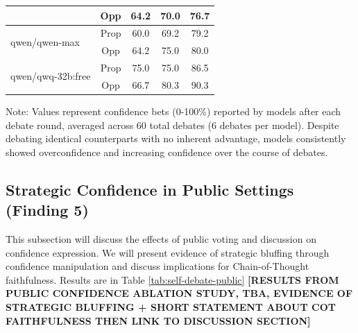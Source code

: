\documentclass{article}
\begin{document}
\begin{table}[htbp]
\begin{tabular}{l|c|ccc}
       & Opp & 64.2 & 70.0 & 76.7 \\
      \midrule
      \multirow{2}{*}{qwen/qwen-max} & Prop & 60.0 & 69.2 & 79.2 \\
       & Opp & 64.2 & 75.0 & 80.0 \\
      \midrule
      \multirow{2}{*}{qwen/qwq-32b:free} & Prop & 75.0 & 75.0 & 86.5 \\
       & Opp & 66.7 & 80.3 & 90.3 \\
      \bottomrule
  \end{tabular}
  \begin{tablenotes}
    \small
    \item Note: Values represent confidence bets (0-100\%) reported by models after each debate round, averaged across 60 total debates (6 debates per model). Despite debating identical counterparts with no inherent advantage, models consistently showed overconfidence and increasing confidence over the course of debates.
  \end{tablenotes}
\end{table}


\subsection{Strategic Confidence in Public Settings (Finding 5)}
This subsection will discuss the effects of public voting and discussion on confidence expression. We will present evidence of strategic bluffing through confidence manipulation and discuss implications for Chain-of-Thought faithfulness.  Results are in Table \ref{tab:self-debate-public} \textbf{[RESULTS FROM PUBLIC CONFIDENCE ABLATION STUDY, TBA, EVIDENCE OF STRATEGIC BLUFFING + SHORT STATEMENT ABOUT COT FAITHFULNESS THEN LINK TO DISCUSSION SECTION]}
\end{document}
